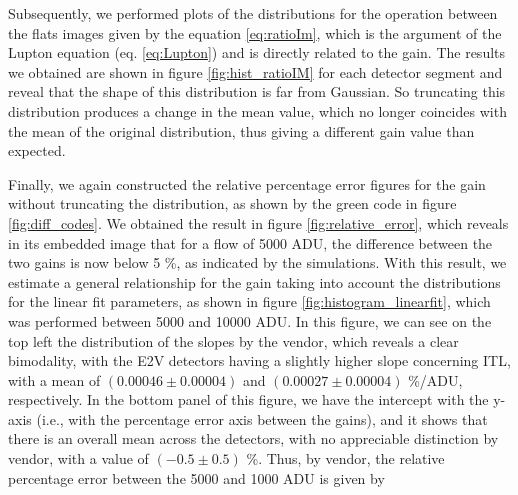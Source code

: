  
Subsequently, we performed plots of the distributions for the operation between the flats images given by the equation \ref{eq:ratioIm}, which is the argument of the Lupton equation (eq. \ref{eq:Lupton}) and is directly related to the gain. The results we obtained are shown in figure \ref{fig:hist_ratioIM} for each detector segment and reveal that the shape of this distribution is far from Gaussian. So truncating this distribution produces a change in the mean value, which no longer coincides with the mean of the original distribution, thus giving a different gain value than expected. 

\vspace{3mm}

Finally, we again constructed the relative percentage error figures for the gain without truncating the distribution, as shown by the green code in figure \ref{fig:diff_codes}. We obtained the result in figure \ref{fig:relative_error}, which reveals in its embedded image that for a flow of 5000 ADU, the difference between the two gains is now below 5 \%, as indicated by the simulations. With this result, we estimate a general relationship for the gain taking into account the distributions for the linear fit parameters, as shown in figure \ref{fig:histogram_linearfit}, which was performed between 5000 and 10000 ADU. In this figure, we can see on the top left the distribution of the slopes by the vendor, which reveals a clear bimodality, with the E2V detectors having a slightly higher slope concerning ITL, with a mean of $(0.00046 \pm 0.00004)$ and $(0.00027 \pm 0.00004)$ \%/ADU, respectively. In the bottom panel of this figure, we have the intercept with the y-axis (i.e., with the percentage error axis between the gains), and it shows that there is an overall mean across the detectors, with no appreciable distinction by vendor, with a value of $(-0.5 \pm 0.5)$ \%. Thus, by vendor, the relative percentage error between the 5000 and 1000 ADU is given by


